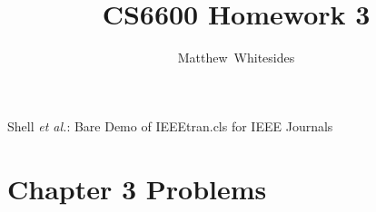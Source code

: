 \documentclass[journal,onecolumn]{IEEEtran}
\begin{document}
%
\title{CS6600 Homework 3}

%
%
%
\author{Matthew~Whitesides}%

%
{Shell \MakeLowercase{\textit{et al.}}: Bare Demo of IEEEtran.cls for IEEE Journals}

\maketitle


\IEEEpeerreviewmaketitle

\section{Chapter 3 Problems}
\end{document}
